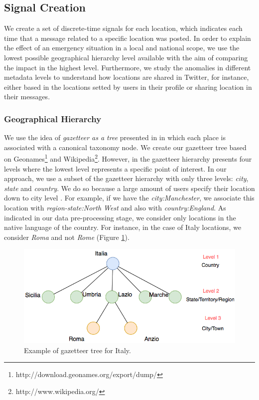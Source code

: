 \documentclass[sigconf]{acmart}
\begin{document}
\subsection{Signal Creation}
We create a set of discrete-time signals for each location, which indicates each time that a message related to a specific location was posted. In order to explain the effect of an emergency situation in a local and national scope, we use the lowest possible geographical hierarchy level available with the aim of comparing the impact in the highest level. Furthermore, we study the anomalies in different metadata levels to understand how locations are shared in Twitter, for instance, either based in the locations setted by users in their profile or sharing location in their messages.


\subsubsection{Geographical Hierarchy}\label{sssec:geohie}
We use the idea of \textit{gazetteer as a tree} presented in \cite{yin2014pinpointing} in which each place is associated with a canonical taxonomy node. We create our gazetteer tree based on Geonames\footnote{http://download.geonames.org/export/dump/} and Wikipedia\footnote{http://www.wikipedia.org/}. However, in \cite{yin2014pinpointing} the gazetteer hierarchy presents four levels where the lowest level represents a specific point of interest. In our approach, we use a subset of the gazetteer hierarchy with only three levels: {\em city}, {\em state} and {\em country}. We do so because a large amount of users specify their location down to city level \cite{hecht2011tweets}. For example, if we have the \textit{city:Manchester}, we associate this location with \textit{region-state:North West} and also with \textit{country:England}. As indicated in our data pre-processing stage, we consider only locations in the native language of the country. For instance, in the case of Italy locations, we consider \textit{Roma} and not \textit{Rome} (Figure \ref{fig:gazetteer}).

\begin{figure}
	\centering
	\includegraphics[width=\columnwidth]{img/gazetteer_example_paper2.png}
	\caption{Example of gazetteer tree for Italy.}
	\label{fig:gazetteer}
\end{figure}
\end{document}
